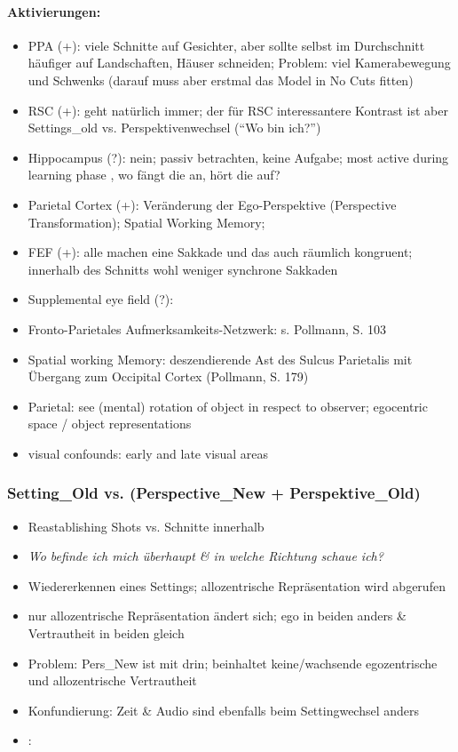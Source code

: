 \documentclass[10pt,a4paper,twocolumn]{article}
\begin{document}
\paragraph*{Aktivierungen:}
\begin{itemize}
	\item PPA (+): viele Schnitte auf Gesichter, aber sollte selbst im Durchschnitt
	häufiger auf Landschaften, Häuser schneiden; Problem: viel Kamerabewegung
	und Schwenks (darauf muss aber erstmal das Model in No Cuts fitten)
	\item RSC (+): geht natürlich immer; der für RSC interessantere Kontrast
	ist aber Settings\_old vs. Perspektivenwechsel (``Wo bin ich?'')
	\item Hippocampus (?): nein; passiv betrachten, keine Aufgabe; most active
	during learning phase \citep{wolbers_2005_retrosplenial_hippocampal_contributions},
	wo fängt die an, hört die auf? 
	\item Parietal Cortex (+): Veränderung der Ego-Perspektive (Perspective
	Transformation); Spatial Working Memory; 
	\item FEF (+): alle machen eine Sakkade und das auch räumlich kongruent;
	innerhalb des Schnitts wohl weniger synchrone Sakkaden
	\item Supplemental eye field (?):
	\item Fronto-Parietales Aufmerksamkeits-Netzwerk: s. Pollmann, S. 103
	\item Spatial working Memory: deszendierende Ast des Sulcus Parietalis mit
	Übergang zum Occipital Cortex (Pollmann, S. 179)
	\item Parietal: see (mental) rotation of object in respect to observer;
	egocentric space / object representations
	\item visual confounds: early and late visual areas
\end{itemize}

\subsubsection*{Setting\_Old vs. (Perspective\_New + Perspektive\_Old) }
\begin{itemize}
	\item Reastablishing Shots vs. Schnitte innerhalb
	\item \emph{Wo befinde ich mich überhaupt \& in welche Richtung schaue ich?}
	\item Wiedererkennen eines Settings; allozentrische Repräsentation wird
	abgerufen
	\item nur allozentrische Repräsentation ändert sich; ego in beiden anders
	\& Vertrautheit in beiden gleich 
	\item Problem: Pers\_New ist mit drin; beinhaltet keine/wachsende egozentrische
	und allozentrische Vertrautheit
	\item Konfundierung: Zeit \& Audio sind ebenfalls beim Settingwechsel anders
	\item \citet{smith_2012_window_to_reality}: 
\end{itemize}
\end{document}
